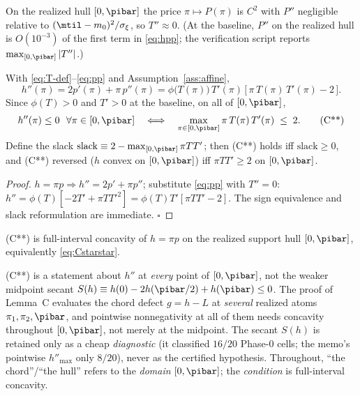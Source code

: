 \begin{assumption}
\label{ass:affine}
On the realized hull $[0,\pibar]$ the price $\pi\mapsto P(\pi)$ is $C^2$ with
$P''$ negligible relative to $(\mtil-m_0)^2/\sigma_\xi$, so $T''\approx0$. (At
the baseline, $P''$ on the realized hull is $O(10^{-3})$ of the first term in
\eqref{eq:hpp}; the verification script reports $\max_{[0,\pibar]}|T''|$.)
\end{assumption}

\begin{lemma}
\label{lem:curvature}
With \eqref{eq:T-def}--\eqref{eq:pp} and Assumption~\ref{ass:affine},
\begin{equation}
  h''(\pi)=2p'(\pi)+\pi\,p''(\pi)
  =\phi\!\big(T(\pi)\big)\,T'(\pi)\,\big[\,\pi\,T(\pi)\,T'(\pi)-2\,\big].
  \label{eq:hpp}
\end{equation}
Since $\phi(T)>0$ and $T'>0$ at the baseline, on all of $[0,\pibar]$,
\begin{equation}
  h''(\pi)\le0\ \ \forall\pi\in[0,\pibar]
  \quad\Longleftrightarrow\quad
  \max_{\pi\in[0,\pibar]}\pi\,T(\pi)\,T'(\pi)\;\le\;2 .
  \tag{C**}
  \label{eq:Cstarstar}
\end{equation}
Define the slack $\mathrm{slack}\equiv2-\max_{[0,\pibar]}\pi T T'$; then
\textup{(C**)} holds iff $\mathrm{slack}\ge0$, and \textup{(C**) reversed}
($h$ convex on $[0,\pibar]$) iff $\pi T T'\ge2$ on $[0,\pibar]$.
\end{lemma}

\begin{proof}
$h=\pi p\Rightarrow h''=2p'+\pi p''$; substitute \eqref{eq:pp} with $T''=0$:
$h''=\phi(T)[-2T'+\pi T T'^2]=\phi(T)T'[\pi T T'-2]$. The sign equivalence and
slack reformulation are immediate. \hfill$\square$
\end{proof}

\begin{definition}[Condition (C**)]
\label{def:Cstarstar}
\textup{(C**)} is full-interval concavity of $h=\pi p$ on the realized support
hull $[0,\pibar]$, equivalently \eqref{eq:Cstarstar}.
\end{definition}

\begin{remark}
\label{rem:full-vs-chord}
(C**) is a statement about $h''$ at \emph{every} point of $[0,\pibar]$, not the
weaker midpoint secant $S(h)\equiv h(0)-2h(\pibar/2)+h(\pibar)\le0$. The proof
of Lemma~C evaluates the chord defect $g=h-L$ at \emph{several} realized atoms
$\pi_1,\pi_2,\pibar$, and pointwise nonnegativity at all of them needs
concavity throughout $[0,\pibar]$, not merely at the midpoint. The secant
$S(h)$ is retained only as a cheap \emph{diagnostic} (it classified $16/20$
Phase-0 cells; the memo's pointwise $h''_{\max}$ only $8/20$), never as the
certified hypothesis. Throughout, ``the chord''/``the hull'' refers to the
\emph{domain} $[0,\pibar]$; the \emph{condition} is full-interval concavity.
\end{remark}

